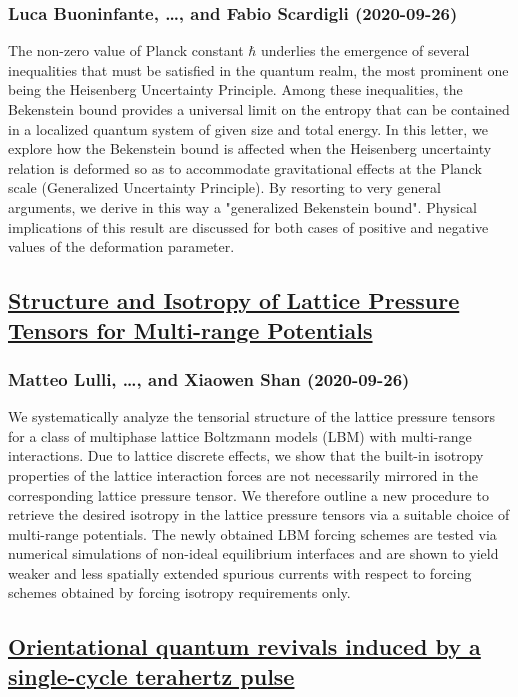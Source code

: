 \subsubsection*{Luca Buoninfante, \dots, and Fabio Scardigli (2020-09-26)}
The non-zero value of Planck constant $\hbar$ underlies the emergence of
several inequalities that must be satisfied in the quantum realm, the most
prominent one being the Heisenberg Uncertainty Principle. Among these
inequalities, the Bekenstein bound provides a universal limit on the entropy
that can be contained in a localized quantum system of given size and total
energy. In this letter, we explore how the Bekenstein bound is affected when
the Heisenberg uncertainty relation is deformed so as to accommodate
gravitational effects at the Planck scale (Generalized Uncertainty Principle).
By resorting to very general arguments, we derive in this way a "generalized
Bekenstein bound". Physical implications of this result are discussed for both
cases of positive and negative values of the deformation parameter.

\subsection*{\href{http://arxiv.org/abs/2009.12522v1}{Structure and Isotropy of Lattice Pressure Tensors for Multi-range  Potentials}}
\subsubsection*{Matteo Lulli, \dots, and Xiaowen Shan (2020-09-26)}
We systematically analyze the tensorial structure of the lattice pressure
tensors for a class of multiphase lattice Boltzmann models (LBM) with
multi-range interactions. Due to lattice discrete effects, we show that the
built-in isotropy properties of the lattice interaction forces are not
necessarily mirrored in the corresponding lattice pressure tensor. We therefore
outline a new procedure to retrieve the desired isotropy in the lattice
pressure tensors via a suitable choice of multi-range potentials. The newly
obtained LBM forcing schemes are tested via numerical simulations of non-ideal
equilibrium interfaces and are shown to yield weaker and less spatially
extended spurious currents with respect to forcing schemes obtained by forcing
isotropy requirements only.

\subsection*{\href{http://arxiv.org/abs/2009.12520v1}{Orientational quantum revivals induced by a single-cycle terahertz pulse}}
